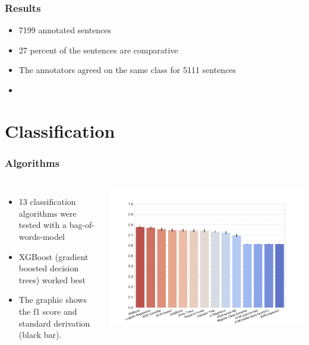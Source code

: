 \documentclass[11pt,aspectratio=169]{beamer}
\begin{document}
    \begin{frame}
        \frametitle{Results}
        \begin{itemize}
            \item 7199 annotated sentences
            \item 27 percent of the sentences are comparative
            \item The annotators agreed on the same class for 5111 sentences
            \item
        \end{itemize}
    \end{frame}

    \section{Classification}
    \frame{\sectionpage}
    \begin{frame}
        \frametitle{Algorithms}
        \begin{columns}[t]
            \column{2in}
            \begin{itemize}
                \item 13 classification algorithms were tested with a bag-of-words-model
                \item XGBoost (gradient boosted decision trees) worked best
                \item  The graphic shows the f1 score and standard derivation (black bar).
            \end{itemize}
            \column{3.5in}

            \includegraphics[scale=0.35,trim={1cm 0 0 5.45cm},clip]{images/classifier.pdf}


        \end{columns}
    \end{frame}
\end{document}
